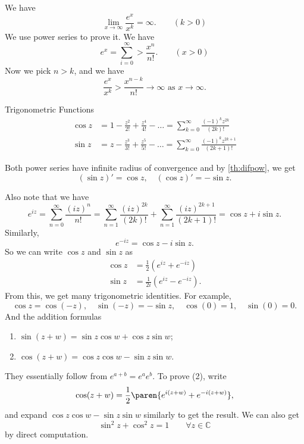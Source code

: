 \begin{remark}
    We have
    \[
        \lim_{x \to \infty} \frac{e^x}{x^k} = \infty. \qquad (k > 0)
    \]
    We use power series to prove it. We have
    \[
        e^x = \sum_{i=0}^{\infty} > \frac{x^n}{n!}. \qquad (x > 0)
    \]
    Now we pick \(n > k\), and we have
    \[
        \frac{e^x}{x^k} > \frac{x^{n-k}}{n!}\to \infty \text{ as }x\to \infty.
    \]
\end{remark}
\begin{definition}{Trigonometric Functions}{}
    \begin{align*}
        \cos z &= 1 - \frac{z^2}{2!} + \frac{z^4}{4!} - \dots = \sum_{k=0}^{\infty} \frac{(-1)^k z^{2k}}{(2k)!}\\
        \sin z &= z - \frac{z^3}{3!} + \frac{z^5}{5!} - \dots = \sum_{k=0}^{\infty} \frac{(-1)^k z^{2k + 1}}{(2k + 1)!}
    \end{align*}
\end{definition}
Both power series have infinite radius of convergence and by \cref{th:difpow}, we get
\[
    (\sin z)' = \cos z,\quad (\cos z)' = -\sin z.
\]

Also note that we have
\[
    e^{iz} = \sum_{n=0}^{\infty} \frac{(iz)^n}{n!} = \sum_{n=1}^{\infty} \frac{(iz)^{2k}}{(2k)!} + \sum_{n=1}^{\infty} \frac{(iz)^{2k + 1}}{(2k + 1)!} = \cos z + i\sin z.
\]
Similarly,
\[
    e^{-iz} = \cos z - i\sin z.
\]
So we can write \(\cos z\) and \(\sin z\) as
\begin{align*}
    \cos z &= \frac{1}{2}(e^{iz} + e^{-iz})\\
    \sin z &= \frac{1}{2i}(e^{iz} - e^{-iz}).
\end{align*}
From this, we get many trigonometric identities. For example,
\[
    \cos z = \cos (-z), \quad \sin(-z) = -\sin z, \quad \cos(0) = 1, \quad \sin (0) = 0.
\]
And the addition formulas
\begin{enumerate}
    \item \(\sin (z + w) = \sin z \cos w + \cos z \sin w\);
    \item \(\cos (z + w) = \cos z \cos w - \sin z \sin w\).
\end{enumerate}
They essentially follow from \(e^{a + b} = e^{a}e^{b}\). To prove (2), write
\[
    \cos (z + w) = \frac{1}{2}\paren{e^{i(z+w)} + e^{-i(z + w)}},
\]
and expand \(\cos z \cos w - \sin z \sin w\) similarly to get the result. We can also get
\begin{equation}
    \label{sincos} 
    \sin^2 z + \cos^2 z = 1 \qquad \forall z \in \mathbb{C}
\end{equation}
by direct computation.

